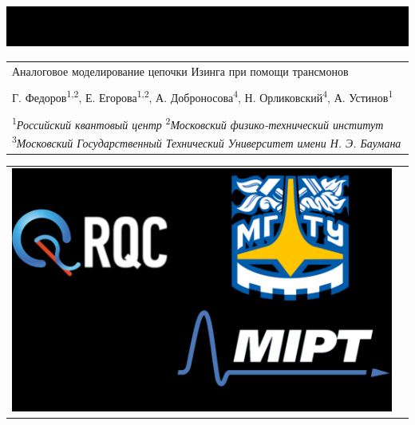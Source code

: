\documentclass[a0, portrait]{a0poster}
\begin{document}
\begin{center}
\vspace*{-2cm}
\hspace*{-2cm}\includegraphics[width=1.2\textwidth]{Black_Landscape}
\end{center}


\begin{minipage}{0.65\textwidth}					
\vspace{-11cm}
\begin{tabular}[t]{l}
{\color{headingcol}\fontsize{68}{70}\selectfont Аналоговое моделирование цепочки Изинга при помощи трансмонов}\\
\\
{\hspace{1cm} \color{white}\large Г. Федоров\textsuperscript{1,2}, Е. Егорова\textsuperscript{1,2}, А. Доброносова\textsuperscript{4}, Н. Орликовский\textsuperscript{4}, А. Устинов\textsuperscript{1}} \\
\\
{\hspace{1.2cm}\color{white}\large \hspace{0.5cm} \textsuperscript{1}\textit{Российский квантовый центр} \hspace{0.5cm} \textsuperscript{2}\textit{Московский физико-технический институт} \hspace{0.5cm} 
\textsuperscript{3}\textit{Московский Государственный Технический Университет имени Н. Э. Баумана}}
\end{tabular}
\end{minipage}
\hspace{19cm}
\begin{minipage}{0.2\textwidth}
\vspace{-11cm}
\begin{tabular}{c c}
\includegraphics[height=0.05\textheight]{logo}
\end{tabular}
\end{minipage}
\end{document}
